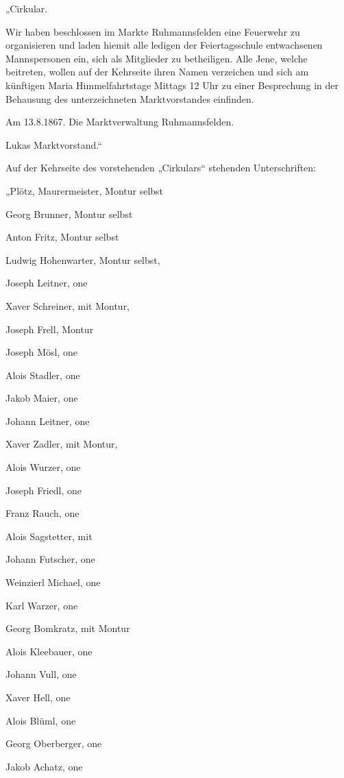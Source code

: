 „Cirkular.



Wir haben beschlossen im Markte Ruhmannsfelden eine Feuerwehr zu organisieren
und laden hiemit alle ledigen der Feiertagsschule entwachsenen Mannspersonen
ein, sich als Mitglieder zu betheiligen. Alle Jene, welche beitreten, wollen auf
der Kehrseite ihren Namen verzeichen und sich am künftigen Maria
Himmelfahrtstage Mittags 12 Uhr zu einer Besprechung in der Behausung des
unterzeichneten Marktvorstandes einfinden.



Am 13.8.1867. Die Marktverwaltung Ruhmannsfelden.

Lukas Marktvorstand.“



Auf der Kehrseite des vorstehenden „Cirkulars“ stehenden Unterschriften:



„Plötz, Maurermeister, Montur selbst

Georg Brunner, Montur selbst

Anton Fritz, Montur selbst

Ludwig Hohenwarter, Montur selbst,

Joseph Leitner, one

Xaver Schreiner, mit Montur,

Joseph Frell, Montur

Joseph Mösl, one

Alois Stadler, one

Jakob Maier, one

Johann Leitner, one

Xaver Zadler, mit Montur,

Alois Wurzer, one

Joseph Friedl, one

Franz Rauch, one

Alois Sagstetter, mit

Johann Futscher, one

Weinzierl Michael, one

Karl Warzer, one

Georg Bomkratz, mit Montur

Alois Kleebauer, one



Johann Vull, one

Xaver Hell, one

Alois Blüml, one

Georg Oberberger, one

Jakob Achatz, one


